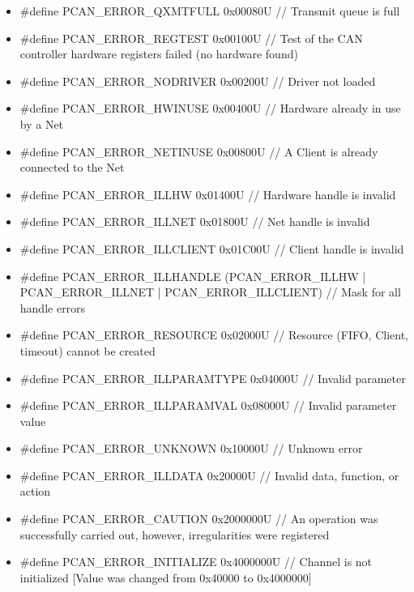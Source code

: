 \documentclass[a4paper,10pt,english]{sphinxmanual}
\begin{document}
\begin{fulllineitems}
\begin{fulllineitems}
\begin{description}
\begin{itemize}
\begin{itemize}
\item {} 
\#define PCAN\_ERROR\_QXMTFULL 0x00080U // Transmit queue is full

\item {} 
\#define PCAN\_ERROR\_REGTEST 0x00100U // Test of the CAN controller hardware registers failed (no hardware found)

\item {} 
\#define PCAN\_ERROR\_NODRIVER 0x00200U // Driver not loaded

\item {} 
\#define PCAN\_ERROR\_HWINUSE 0x00400U // Hardware already in use by a Net

\item {} 
\#define PCAN\_ERROR\_NETINUSE 0x00800U // A Client is already connected to the Net

\item {} 
\#define PCAN\_ERROR\_ILLHW 0x01400U // Hardware handle is invalid

\item {} 
\#define PCAN\_ERROR\_ILLNET 0x01800U // Net handle is invalid

\item {} 
\#define PCAN\_ERROR\_ILLCLIENT 0x01C00U // Client handle is invalid

\item {} 
\#define PCAN\_ERROR\_ILLHANDLE (PCAN\_ERROR\_ILLHW | PCAN\_ERROR\_ILLNET | PCAN\_ERROR\_ILLCLIENT) // Mask for all handle errors

\item {} 
\#define PCAN\_ERROR\_RESOURCE 0x02000U // Resource (FIFO, Client, timeout) cannot be created

\item {} 
\#define PCAN\_ERROR\_ILLPARAMTYPE 0x04000U // Invalid parameter

\item {} 
\#define PCAN\_ERROR\_ILLPARAMVAL 0x08000U // Invalid parameter value

\item {} 
\#define PCAN\_ERROR\_UNKNOWN 0x10000U // Unknown error

\item {} 
\#define PCAN\_ERROR\_ILLDATA 0x20000U // Invalid data, function, or action

\item {} 
\#define PCAN\_ERROR\_CAUTION 0x2000000U // An operation was successfully carried out, however, irregularities were registered

\item {} 
\#define PCAN\_ERROR\_INITIALIZE 0x4000000U // Channel is not initialized {[}Value was changed from 0x40000 to 0x4000000{]}


\end{itemize}
\end{itemize}
\end{description}
\end{fulllineitems}
\end{fulllineitems}
\end{document}
